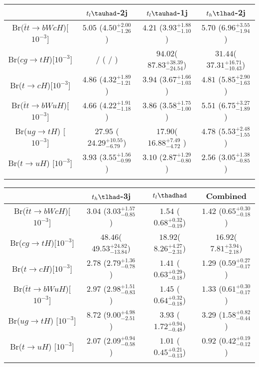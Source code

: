 \centering
\begin{tabular}{cccc} \toprule\toprule
 & $t_l\tauhad$-2j & $t_l\tauhad$-1j & $t_h\tlhad$-2j\\\midrule
Br($\bar{t}t\to bWcH$)[$10^{-3}$]     & $5.05$  ($4.50^{+2.00}_{-1.26}$  ) & $4.21$ ($3.93^{+1.88}_{-1.10}$   )& $5.70$ ($6.96^{+3.55}_{-1.94}$   ) \\
Br($cg\to tH$)[$10^{-3}]$             &  /      ( /                      ) & $94.02$($87.83^{+38.39}_{-24.54}$)& $31.44$($37.31^{+16.71}_{-10.43}$) \\
Br($t\to cH$)[$10^{-3}$]              & $4.86$  ($4.32^{+1.89}_{-1.21}$  ) & $3.94$ ($3.67^{+1.66}_{-1.03}$   )& $4.81$ ($5.85^{+2.90}_{-1.63}$   ) \\
Br($\bar{t}t\to bWuH$)[$10^{-3}$]     & $4.66$  ($4.22^{+1.91}_{-1.18}$  ) & $3.86$ ($3.58^{+1.75}_{-1.00}$   )& $5.51$ ($6.75^{+3.27}_{-1.89}$   ) \\
Br($ug\to tH$) [$10^{-3}$]            & $27.95$ ($24.29^{+10.55}_{-6.79}$) & $17.90$($16.88^{+7.49}_{-4.72}$  )& $4.78$ ($5.53^{+2.48}_{-1.55}$   ) \\
Br($t\to uH$)  [$10^{-3}$]            & $3.93$  ($3.55^{+1.56}_{-0.99}$  ) & $3.10$ ($2.87^{+1.29}_{-0.80}$   )& $2.56$ ($3.05^{+1.38}_{-0.85}$   ) \\
\bottomrule\bottomrule\\    
\end{tabular}
\begin{tabular}{cccc} \toprule\toprule
 & $t_h\tlhad$-3j & $t_l\thadhad$ & Combined\\\midrule
Br($\bar{t}t\to bWcH$)[$10^{-3}$]            &$3.04$ ($3.03^{+1.57}_{-0.85}$   ) & $1.54$ ($0.68^{+0.32}_{-0.19}$) & $1.42$ ($0.65^{+0.30}_{-0.18}$)\\
Br($cg\to tH$)[$10^{-3}]$                    &$48.46$($49.53^{+24.82}_{-13.84}$) & $18.92$($8.26^{+4.27}_{-2.31}$) & $16.92$($7.81^{+3.94}_{-2.18}$)\\
Br($t\to cH$)[$10^{-3}$]                     &$2.78$ ($2.79^{+1.36}_{-0.78}$   ) & $1.41$ ($0.63^{+0.29}_{-0.18}$) & $1.29$ ($0.59^{+0.27}_{-0.17}$)\\
Br($\bar{t}t\to bWuH$)[$10^{-3}$]            &$2.97$ ($2.98^{+1.51}_{-0.83}$   ) & $1.45$ ($0.64^{+0.32}_{-0.18}$) & $1.33$ ($0.61^{+0.30}_{-0.17}$)\\
Br($ug\to tH$) [$10^{-3}$]                   &$8.72$ ($9.00^{+4.98}_{-2.51}$   ) & $3.93$ ($1.72^{+0.94}_{-0.48}$) & $3.29$ ($1.58^{+0.82}_{-0.44}$)\\
Br($t\to uH$)  [$10^{-3}$]                   &$2.07$ ($2.09^{+0.94}_{-0.58}$   ) & $1.01$ ($0.45^{+0.21}_{-0.13}$) & $0.92$ ($0.42^{+0.19}_{-0.12}$)\\
\bottomrule\bottomrule\\
\end{tabular}


